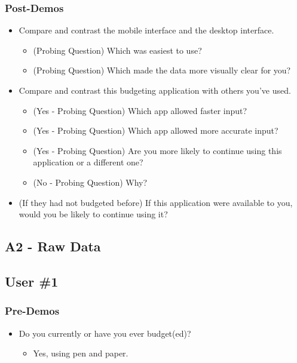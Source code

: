 \documentclass{chi2011}
\begin{document}
	\subsubsection{Post-Demos}
	\begin{itemize}[noitemsep]
		\item Compare and contrast the mobile interface and the desktop interface.
		\begin{itemize}[noitemsep]
			\item (Probing Question) Which was easiest to use?
			\item (Probing Question) Which made the data more visually clear for you?
		\end{itemize}	
	\item  Compare and contrast this budgeting application with others you've used.
		\begin{itemize}[noitemsep]
			\item (Yes - Probing Question) Which app allowed faster input?
			\item (Yes - Probing Question) Which app allowed more accurate input?
			\item (Yes - Probing Question) Are you more likely to continue using this application or a different one?
			\item (No - Probing Question) Why?
		\end{itemize}
	\item (If they had not budgeted before) If this application were available to you, would you be likely to continue using it? 
	\end{itemize}
	
	
	\subsection{A2 - Raw Data}
	
	\subsection{User \#1}

	\subsubsection{Pre-Demos}
	\begin{itemize}[noitemsep]
		\item Do you currently or have you ever budget(ed)?
		\begin{itemize}[noitemsep]
			\item 
				Yes, using pen and paper.
		\end{itemize}
	\end{itemize}
	
\end{document}
